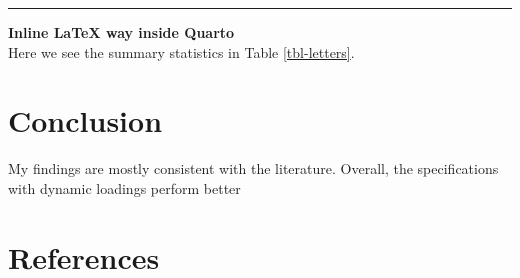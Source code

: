 \documentclass[
  12pt,
  a4paper,
  openany]{scrbook}
\begin{document}
\begin{center}\rule{0.5\linewidth}{0.5pt}\end{center}

\textbf{Inline LaTeX way inside Quarto}\\
Here we see the summary statistics in Table \ref{tbl-letters}.


\chapter{Conclusion}\label{conclusion}

My findings are mostly consistent with the literature. Overall, the
specifications with dynamic loadings perform better


\chapter*{References}\label{references}

\end{document}
